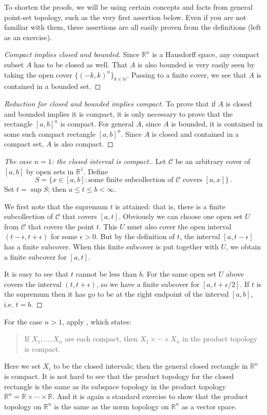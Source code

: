 \documentclass[12pt]{article}
\newcommand{\real}{\mathbb{R}}
\newcommand{\nat}{\mathbb{N}}
\begin{document}
To shorten the proofs, we will be using certain concepts and facts from general 
point-set topology, such as the very first assertion below.
Even if you are not familiar with them, 
these assertions are all easily proven from the definitions (left as an exercise). 

\begin{proof}[Compact implies closed and bounded]
Since $\real^n$ is a Hausdorff space, any compact subset $A$ has to be closed as well.
That $A$ is also bounded is very easily seen by taking
the open cover $\{ (-k, k)^n \}_{k \in \nat}$.
Passing to a finite cover, we see that $A$ is contained
in a bounded set.
\end{proof}

\begin{proof}[Reduction for closed and bounded implies compact]
To prove that if $A$ is closed and bounded implies it is compact,
it is only necessary to prove that the rectangle $[a,b]^n$ is compact.
For general $A$, since $A$ is bounded, it is contained in some such compact 
rectangle $[a, b]^n$.
Since $A$ is closed and contained in a compact set, $A$ is also compact.
\end{proof}

\begin{proof}[The case $n=1$: the closed interval is compact.]
Let $\mathcal{C}$ be an arbitrary cover of $[a, b]$ by open sets in $\real^1$.
Define 
\[
 S = \{ x \in [a,b] : \textrm{some finite subcollection of $\mathcal{C}$ covers $[a, x]$} \}\,.
\]
Set $t = \sup S$; then $a \leq t \leq b < \infty$.

We first note that the supremum $t$ is attained:
that is, there is a finite subcollection of $\mathcal{C}$ that covers $[a,t]$.
Obviously we can choose one open set $U$ from $\mathcal{C}$ that covers the point $t$.
This $U$ must also cover the open interval $(t-\epsilon, t+\epsilon)$ for some $\epsilon > 0$.
But by the definition of $t$, the interval $[a, t-\epsilon]$ has a finite subcover.
When this finite subcover is put together with $U$, we obtain a finite subcover for $[a, t]$.

It is easy to see that $t$ cannot be less than $b$.
For the same open set $U$ above covers the interval $(t, t+\epsilon)$, 
so we have a finite subcover for $[a, t+\epsilon/2]$.
If $t$ is the supremum then it has go to be at the right endpoint of the interval $[a, b]$, i.e.
$t = b$.
\end{proof}

For the case $n > 1$, apply 
, which states:
\begin{quote}
If $X_1, \dotsc, X_n$ are each compact,
then $X_1 \times \dotsm \times X_n$ in the product topology is compact.
\end{quote}
Here we set $X_i$ to be the closed intervals; then the general closed rectangle in $\real^n$
is compact.  It is not hard to see that the product topology for the closed rectangle is the same
as its subspace topology in the product topology $\real^n = \real \times \dotsm \times \real$.
And it is again a standard exercise to show that the product topology on $\real^n$ is the 
same as the norm topology on $\real^n$ as a vector space.
\end{document}

